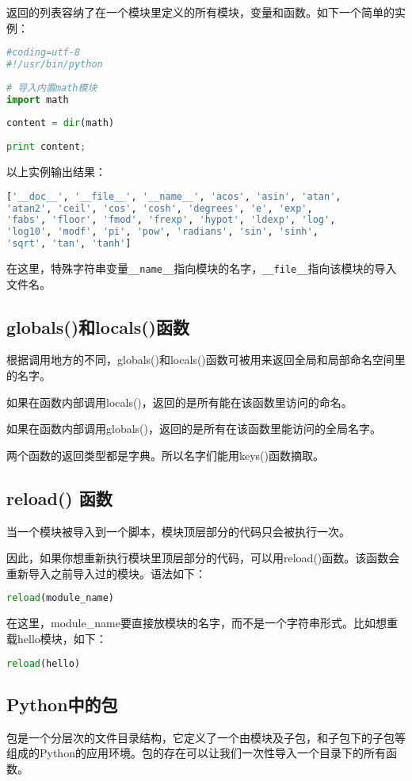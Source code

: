 返回的列表容纳了在一个模块里定义的所有模块，变量和函数。如下一个简单的实例：
\begin{lstlisting}[language=Python]
#coding=utf-8
#!/usr/bin/python
 
# 导入内置math模块
import math
 
content = dir(math)
 
print content;
\end{lstlisting}
以上实例输出结果：
\begin{lstlisting}[language=Python]
['__doc__', '__file__', '__name__', 'acos', 'asin', 'atan', 
'atan2', 'ceil', 'cos', 'cosh', 'degrees', 'e', 'exp', 
'fabs', 'floor', 'fmod', 'frexp', 'hypot', 'ldexp', 'log',
'log10', 'modf', 'pi', 'pow', 'radians', 'sin', 'sinh', 
'sqrt', 'tan', 'tanh']
\end{lstlisting}
在这里，特殊字符串变量\verb|__name__|指向模块的名字，\verb|__file__|指向该模块的导入文件名。



\subsection{globals()和locals()函数}
根据调用地方的不同，globals()和locals()函数可被用来返回全局和局部命名空间里的名字。

如果在函数内部调用locals()，返回的是所有能在该函数里访问的命名。

如果在函数内部调用globals()，返回的是所有在该函数里能访问的全局名字。

两个函数的返回类型都是字典。所以名字们能用keys()函数摘取。



\subsection{reload() 函数}
当一个模块被导入到一个脚本，模块顶层部分的代码只会被执行一次。

因此，如果你想重新执行模块里顶层部分的代码，可以用reload()函数。该函数会重新导入之前导入过的模块。语法如下：
\begin{lstlisting}[language=Python]
reload(module_name)
\end{lstlisting}
在这里，module\_name要直接放模块的名字，而不是一个字符串形式。比如想重载hello模块，如下：
\begin{lstlisting}[language=Python]
reload(hello)
\end{lstlisting}



\subsection{ Python中的包}
包是一个分层次的文件目录结构，它定义了一个由模块及子包，和子包下的子包等组成的Python的应用环境。包的存在可以让我们一次性导入一个目录下的所有函数。

